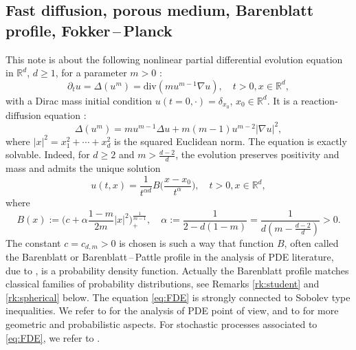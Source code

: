 \documentclass[10pt,reqno]{amsart}
\numberwithin{equation}{section}
\begin{document}
\subsection{Fast diffusion, porous medium, Barenblatt profile, Fokker\texorpdfstring{\,--\,}{--}Planck}
This note is about the following nonlinear partial differential evolution equation in $\mathbb{R}^d$, $d\geq1$,
for a parameter $m>0$ :
\begin{equation}\label{eq:FDE}
    \partial_t u
    =\Delta(u^m)
    =\mathrm{div}(mu^{m-1}\nabla u)
   ,\quad t>0,x\in\mathbb{R}^d,
\end{equation}
with a Dirac mass initial condition $u(t=0,\cdot)=\delta_{x_0}$, $x_0\in\mathbb{R}^d$. 
It is a reaction-diffusion equation :
\begin{equation}
\Delta(u^m)=m u^{m-1} \Delta u+m (m-1) u^{m-2} |\nabla u|^2, 
\end{equation}
where $|x|^2=x_1^2+\cdots+x_d^2$ is the squared Euclidean norm. The equation is exactly solvable. Indeed, for $d\geq2$ and $m>\frac{d-2}{d}$, the evolution preserves positivity and mass and admits the unique solution 
\begin{equation}\label{eq:sol}
    u(t,x)=\frac{1}{t^{\alpha d}}B\Bigr(\frac{x-x_0}{t^\alpha}\Bigr),\quad t>0,x\in\mathbb{R}^d,
\end{equation}
where 
\begin{equation}\label{eq:B}
    B(x):={\Bigr(c+\alpha\frac{1-m}{2m}|x|^2\Bigr)_+^{\frac{1}{m-1}}},
    \quad
    \alpha:=\frac{1}{2-d(1-m)}
    =\frac{1}{d(m-\frac{d-2}{d})}>0.
\end{equation}
The constant $c=c_{d,m}>0$ is chosen is such a way that  function $B$, often called the Barenblatt or Barenblatt\,--\,Pattle profile in the analysis of PDE literature, due to \cite{MR0046217,MR0114505}, is a probability density function. Actually the Barenblatt profile matches classical families of probability distributions, see Remarks \ref{rk:student} and \ref{rk:spherical} below. The equation \eqref{eq:FDE} is strongly connected to Sobolev type inequalities. We refer to \cite{MR1940370,MR1986060,bonforte:hal-02887010,MR2286292,zbMATH05058450,zbMATH06622527,zbMATH06431289} for the analysis of PDE point of view, and to \cite{demange-thesis,MR2178944,MR2381156} for more geometric and probabilistic aspects. For stochastic processes associated to \eqref{eq:FDE}, we refer to \cite{MR1027932,MR1469575,MR2421181}.
\end{document}
